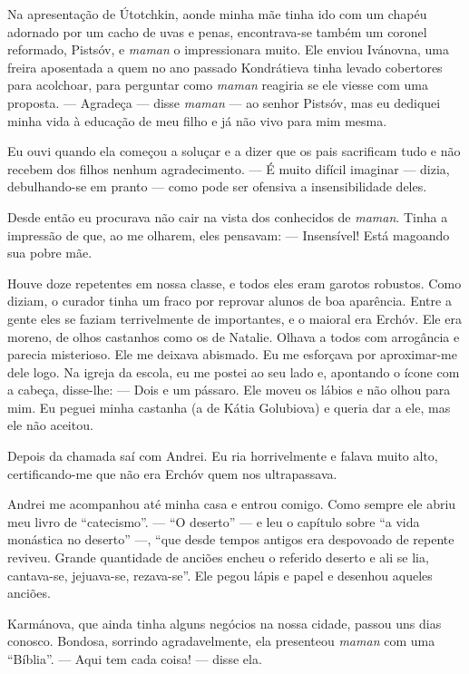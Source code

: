 Na apresentação de Útotchkin, aonde minha mãe tinha ido com um chapéu
adornado por um cacho de uvas e penas, encontrava-se também um coronel
reformado, Pistsóv, e \emph{maman} o impressionara muito. Ele enviou
Ivánovna, uma freira aposentada a quem no ano passado Kondrátieva tinha
levado cobertores para acolchoar, para perguntar como \emph{maman}
reagiria se ele viesse com uma proposta. --- Agradeça --- disse
\emph{maman} --- ao senhor Pistsóv, mas eu dediquei minha vida à
educação de meu filho e já não vivo para mim mesma.

Eu ouvi quando ela começou a soluçar e a dizer que os pais sacrificam
tudo e não recebem dos filhos nenhum agradecimento. --- É muito difícil
imaginar --- dizia, debulhando-se em pranto --- como pode ser ofensiva a
insensibilidade deles.

Desde então eu procurava não cair na vista dos conhecidos de
\emph{maman}. Tinha a impressão de que, ao me olharem, eles pensavam:
--- Insensível! Está magoando sua pobre mãe.

Houve doze repetentes em nossa classe, e todos eles eram garotos
robustos. Como diziam, o curador tinha um fraco por reprovar alunos de
boa aparência. Entre a gente eles se faziam terrivelmente de
importantes, e o maioral era Erchóv. Ele era moreno, de olhos castanhos
como os de Natalie. Olhava a todos com arrogância e parecia misterioso.
Ele me deixava abismado. Eu me esforçava por aproximar-me dele logo. Na
igreja da escola, eu me postei ao seu lado e, apontando o ícone com a
cabeça, disse-lhe: --- Dois e um pássaro. Ele moveu os lábios e não
olhou para mim. Eu peguei minha castanha (a de Kátia Golubiova) e queria
dar a ele, mas ele não aceitou.

Depois da chamada saí com Andrei. Eu ria horrivelmente e falava muito
alto, certificando-me que não era Erchóv quem nos ultrapassava.

Andrei me acompanhou até minha casa e entrou comigo. Como sempre ele
abriu meu livro de ``catecismo''. --- ``O deserto'' --- e leu o capítulo
sobre ``a vida monástica no deserto'' ---, ``que desde tempos antigos
era despovoado de repente reviveu. Grande quantidade de anciões encheu o
referido deserto e ali se lia, cantava-se, jejuava-se, rezava-se''. Ele
pegou lápis e papel e desenhou aqueles anciões.

Karmánova, que ainda tinha alguns negócios na nossa cidade, passou uns
dias conosco. Bondosa, sorrindo agradavelmente, ela presenteou
\emph{maman} com uma ``Bíblia''. --- Aqui tem cada coisa! --- disse ela.

